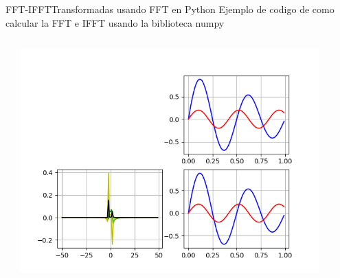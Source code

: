 \begin{frame}{FFT-IFFT}{Transformadas usando FFT en Python}
   \handsonicon
   Ejemplo de codigo de como calcular la FFT e IFFT usando la biblioteca numpy
   \begin{columns}[c]
      \hspace{2pt}
      \begin{column}{.55\textwidth}
         
      \end{column}
      \hspace{2pt}
      \vrule
      \hspace{2pt}
      \begin{column}{.45\textwidth}
         \centering\includegraphics[width=0.9\textwidth]{4_clase/fft1}
      \end{column}
   \end{columns}
   \vfill
\end{frame}
